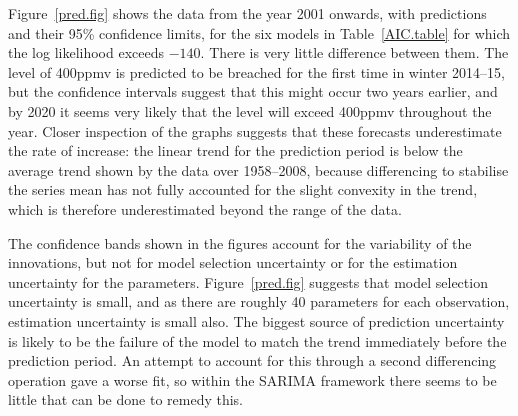\documentclass[a4paper,11pt]{article}\usepackage[]{graphicx}\usepackage[]{color}
\begin{document}
Figure~\ref{pred.fig} shows the data from the year 2001 onwards, with predictions and their 95\% confidence limits, for the six models in Table~\ref{AIC.table} for which the log likelihood exceeds $-140$. There is very little difference between them.  The level of 400ppmv is predicted to be breached for the first time in winter 2014--15, but the confidence intervals suggest that this might occur two years earlier, and by 2020 it seems very likely that the level will exceed 400ppmv throughout the year.  Closer inspection of the graphs suggests that these forecasts underestimate the rate of increase: the linear trend for the prediction period is below the average trend shown by the data over 1958--2008, because differencing to stabilise the series mean has not fully accounted for the slight convexity in the trend, which is therefore underestimated beyond the range of the data.  

The confidence bands shown in the figures account for the variability of the innovations, but not for model selection uncertainty or for the estimation uncertainty for the parameters.  Figure~\ref{pred.fig} suggests that model selection uncertainty is small, and as there are roughly 40 parameters for each observation, estimation uncertainty is small also.  The biggest source of prediction uncertainty is likely to be the failure of the model to match the trend immediately before the prediction period.  An attempt to account for this through a second differencing operation gave a worse fit, so within the SARIMA framework there seems to be little that can be done to remedy this.
\end{document}
